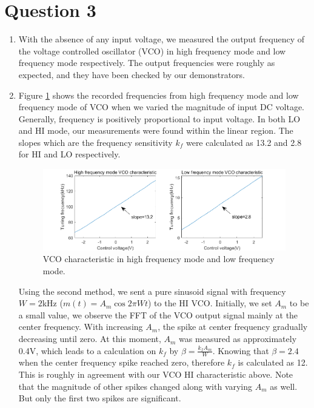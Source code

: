 \documentclass[11pt]{article}
\begin{document}
\section*{Question 3}
\begin{enumerate}[label=(\alph*)]
\item With the absence of any input voltage, we measured the output frequency of the voltage controlled oscillator (VCO) in high frequency mode and low frequency mode respectively. The output frequencies were roughly as expected, and they have been checked by our demonstrators.  
\item Figure \ref{fig:vco} shows the recorded frequencies from high frequency mode and low frequency mode of VCO when we varied the magnitude of input DC voltage. Generally, frequency is positively proportional to input voltage. In both LO and HI mode, our measurements were found within the linear region. The slopes which are the frequency sensitivity $k_f$ were calculated as 13.2 and 2.8 for HI and LO respectively.
\begin{figure}[H]
    \centering
    \includegraphics[scale=0.7]{VCOplot.png}
    \caption{VCO characteristic in high frequency mode and low frequency mode.}
    \label{fig:vco}
\end{figure}

Using the second method, we sent a pure sinusoid signal with frequency $W=2$kHz ($m(t)=A_m \cos{2\pi Wt}$) to the HI VCO. Initially, we set $A_m$ to be a small value, we observe the FFT of the VCO output signal mainly at the center frequency. With increasing $A_m$, the spike at center frequency gradually decreasing until zero. At this moment, $A_m$ was measured as approximately 0.4V, which leads to a calculation on $k_f$ by $\beta=\frac{k_f A_m}{W}$. Knowing that $\beta=2.4$ when the center frequency spike reached zero, therefore $k_f$ is calculated as 12. This is roughly in agreement with our VCO HI characteristic above. Note that the magnitude of other spikes changed along with varying $A_m$ as well. But only the first two spikes are significant.  


\end{enumerate}
\end{document}
